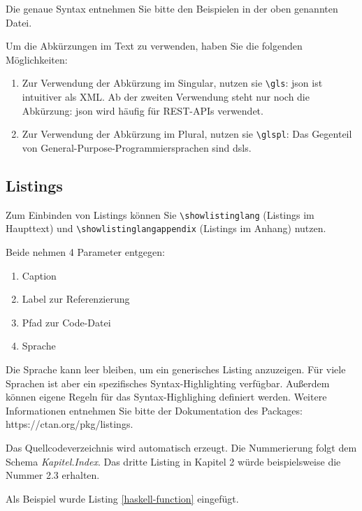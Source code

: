 Die genaue Syntax entnehmen Sie bitte den Beispielen in der oben genannten Datei.

Um die Abkürzungen im Text zu verwenden, haben Sie die folgenden Möglichkeiten:

\begin{enumerate}
    \item Zur Verwendung der Abkürzung im Singular, nutzen sie \lstinline|\gls|: \gls{json} ist intuitiver als XML. Ab der zweiten Verwendung steht nur noch die Abkürzung: \gls{json} wird häufig für REST-APIs verwendet.
    \item Zur Verwendung der Abkürzung im Plural, nutzen sie \lstinline|\glspl|: Das Gegenteil von General-Purpose-Programmiersprachen sind \glspl{dsl}.
\end{enumerate}


\subsection{Listings}

Zum Einbinden von Listings können Sie \lstinline|\showlistinglang| (Listings im Haupttext) und \lstinline|\showlistinglangappendix| (Listings im Anhang) nutzen. 

Beide nehmen 4 Parameter entgegen:

\begin{enumerate}
    \item Caption
    \item Label zur Referenzierung
    \item Pfad zur Code-Datei
    \item Sprache
\end{enumerate}

Die Sprache kann leer bleiben, um ein generisches Listing anzuzeigen. Für viele Sprachen ist aber ein spezifisches Syntax-Highlighting verfügbar. Außerdem können eigene Regeln für das Syntax-Highlighing definiert werden. Weitere Informationen entnehmen Sie bitte der Dokumentation des Packages: https://ctan.org/pkg/listings.

Das Quellcodeverzeichnis wird automatisch erzeugt. Die Nummerierung folgt dem Schema \textit{Kapitel.Index}. Das dritte Listing in Kapitel 2 würde beispielsweise die Nummer 2.3 erhalten.


Als Beispiel wurde Listing \ref{haskell-function} eingefügt.

